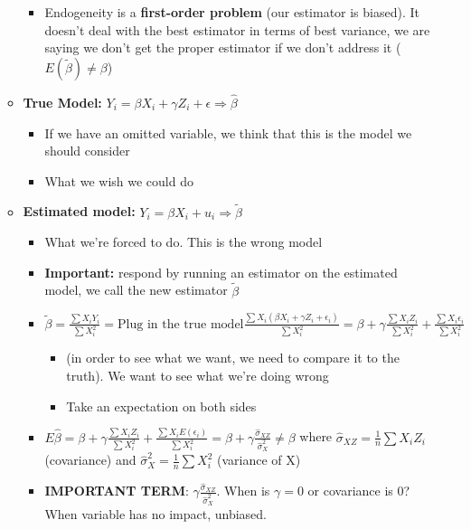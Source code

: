 \documentclass[10pt, oneside]{article}
\begin{document}
\begin{itemize}
\begin{itemize}
\begin{itemize}
            \item Endogeneity is a \textbf{first-order problem} (our estimator is biased). It doesn't deal with the best estimator in terms of best variance, we are saying we don't get the proper estimator if we don't address it ($E(\tilde \beta) \neq \beta$)
        \end{itemize}
        \item \textbf{True Model:} $Y_i = \beta X_i + \gamma Z_i + \epsilon \Rightarrow \hat \beta$
        \begin{itemize}
            \item If we have an omitted variable, we think that this is the model we should consider
            \item What we wish we could do
        \end{itemize}
        \item \textbf{Estimated model:} $Y_i = \beta X_i + u_i \Rightarrow \tilde\beta$
        \begin{itemize}
            \item What we're forced to do. This is the wrong model
            \item \textbf{Important:} respond by running an estimator on the estimated model, we call the new estimator $\tilde \beta$
            \item $\tilde \beta = \frac{\sum X_iY_i}{\sum X_i^2} = \text{Plug in the true model} \frac{\sum X_i (\beta X_i + \gamma Z_i + \epsilon_i)}{\sum X_i^2} = \beta + \gamma \frac{\sum X_i Z_i}{\sum X_i ^2} + \frac{\sum X_i \epsilon_i }{\sum X_i^2}$
            \begin{itemize}
                \item  (in order to see what we want, we need to compare it to the truth). We want to see what we're doing wrong 
                \item Take an expectation on both sides
            \end{itemize}
            \item $E\hat \beta = \beta + \gamma \frac{\sum X_i Z_i}{\sum X_i ^2} + \frac{\sum X_i E(\epsilon_i )}{ \sum X_i^2} = \beta + \gamma \frac{\hat \sigma_{XZ}}{\hat \sigma^2 _X} \neq \beta$ where $\hat \sigma_{XZ} = \frac{1}{n} \sum X_iZ_i$ (covariance) and $\hat \sigma^2 _X = \frac{1}{n}\sum X_i^2$ (variance of X)
            \item \textbf{IMPORTANT TERM}: $\gamma \frac{\hat \sigma _{XZ}}{\hat \sigma_X ^2}$. When is $\gamma = 0$ or covariance is 0? When variable has no impact, unbiased.

\end{itemize}
\end{itemize}
\end{itemize}
\end{document}
